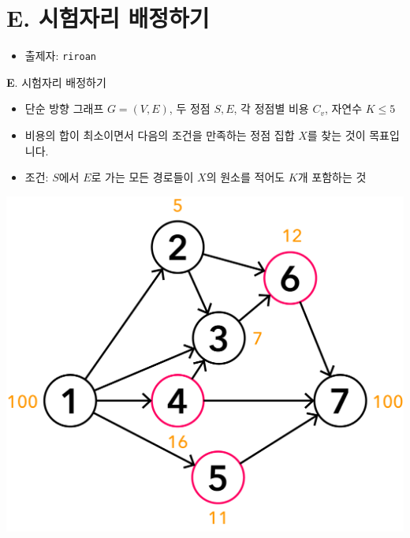 \section{E. 시험자리 배정하기}

\begin{frame} %
    \begin{itemize}
        \item 출제자: \texttt{riroan}
    \end{itemize}
\end{frame}

\begin{frame}{\textbf{E}. 시험자리 배정하기}

    \begin{itemize}
        \item 단순 방향 그래프 $G = (V, E)$, 두 정점 $S, E$, 각 정점별 비용 $C_v$, 자연수 $K \leq 5$
        \item 비용의 합이 최소이면서 다음의 조건을 만족하는 정점 집합 $X$를 찾는 것이 목표입니다.
        \item 조건: $S$에서 $E$로 가는 모든 경로들이 $X$의 원소를 적어도 $K$개 포함하는 것
    \end{itemize}
    
    \begin{center}
        \includegraphics[width=0.3\linewidth]{../images/setting-maps/maps_ex_1.png}
    \end{center}
    
\end{frame}